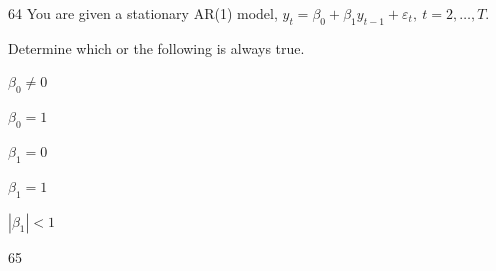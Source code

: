 \begin{question}{64}
You are given a stationary AR(1) model, $y_t = \beta_0 + \beta_1 y_{t-1} + \varepsilon_t,\ t = 2, \ldots, T.$

Determine which or the following is always true.

\begin{choices}
\item $\beta_0 \ne 0$
\item $\beta_0 = 1$
\item $\beta_1 = 0$
\item $\beta_1 = 1$
\item $|\beta_1| < 1$
\end{choices}
\end{question}

\begin{question}{65}
\deleted
\end{question}

